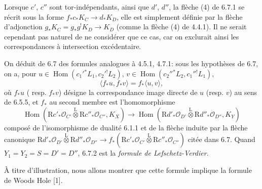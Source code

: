 \documentclass[11pt]{article}
\providecommand{\cO}{\mathcal{O}}
\DeclareMathOperator{\Hom}{Hom}
\newcommand{\R}{\mathrm{R}}\newcommand{\RHomCore}{\mathrm{RHom}}
\providecommand{\Hom}{\operatorname{Hom}}
\providecommand{\R}{\mathrm R}
\providecommand{\Hom}{\operatorname{Hom}}
\begin{document}
Lorsque $c'$, $c''$ sont tor-indépendants, ainsi que $d'$, $d''$, la flèche (4) de 6.7.1 se récrit sous la forme $f_*c_*K_C\to d_*K_D$, elle est simplement définie par la flèche d'adjonction $g_*K_C=g_*g^!K_D\to K_D$ (comme la flèche (4) de 4.4.1). Il ne serait cependant pas naturel de ne considérer que ce cas, car on exclurait ainsi les correspondances à intersection excédentaire.

On déduit de 6.7 des formules analogues à 4.5.1, 4.7.1: sous les hypothèses de 6.7, on a, pour $u\in\Hom(c_1'{}^*L_1,c_2'{}^!L_2)$, $v\in\Hom(c_2''{}^*L_2,c_1''{}^!L_1)$,
\begin{equation}
\tag{6.7.2}
\langle f_*u,f_*v\rangle=f_*\langle u,v\rangle,
\end{equation}
où $f_*u$ (
resp. $f_*v$) désigne la correspondance image directe de $u$ (resp. $v$) au sens de 6.5.5, et $f_*$ au second membre est l'homomorphisme
\begin{equation}
\tag{6.7.3}
\Hom(\R c'_*\cO_{C'}\overset{\mathrm{L}}{\otimes}\R c''_*\cO_{C''},K_X)
\longrightarrow
\Hom(\R d'_*\cO_{D'}\overset{\mathrm{L}}{\otimes}\R d''_*\cO_{D''},K_Y)
\end{equation}
composé de l'isomorphisme de dualité 6.1.1 et de la flèche induite par la flèche canonique $\R d'_*\cO_{D'}\overset{\mathrm{L}}{\otimes}\R d''_*\cO_{D''}\longrightarrow f_*(\R c'_*\cO_{C'}\overset{\mathrm{L}}{\otimes}\R c''_*\cO_{C''})$ citée dans 6.7. Quand $Y_1=Y_2=S=D'=D''$, 6.7.2 est la \emph{formule de Lefschetz-Verdier}.

À titre d'illustration, nous allons montrer que cette formule implique la formule de Woods Hole [1].
\end{document}

